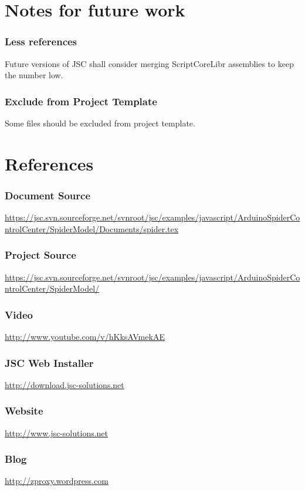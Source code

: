 \documentclass[12pt,leqno]{book}
\begin{document}
\chapter{Notes for future work}

\subsection{Less references}
Future versions of JSC shall consider merging ScriptCoreLibr assemblies to keep the number low.

\subsection{Exclude from Project Template}
Some files should be excluded from project template. 

\chapter{References}

\subsection{Document Source}

\url{https://jsc.svn.sourceforge.net/svnroot/jsc/examples/javascript/ArduinoSpiderControlCenter/SpiderModel/Documents/spider.tex}

\subsection{Project Source}
\url{https://jsc.svn.sourceforge.net/svnroot/jsc/examples/javascript/ArduinoSpiderControlCenter/SpiderModel/}



\subsection{Video}
\url{http://www.youtube.com/v/hKksAVmekAE}

\subsection{JSC Web Installer}
\url{http://download.jsc-solutions.net}

\subsection{Website}
\url{http://www.jsc-solutions.net}

\subsection{Blog}
\url{http://zproxy.wordpress.com}
\end{document}

